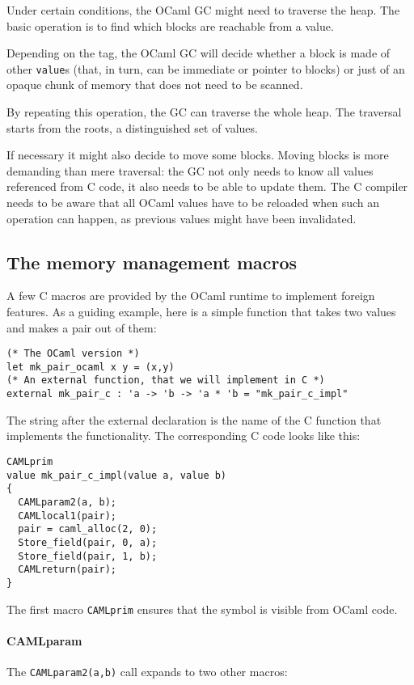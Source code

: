 \documentclass[a4paper]{easychair}
\newcommand{\cpp}[1]{\lstinline[style=C++]{#1}}
\begin{document}
Under certain conditions, the OCaml GC might need to traverse the heap.
The basic operation is to find which blocks are reachable from a value.

Depending on the tag, the OCaml GC will decide whether a block is made
of other \cpp{value}s (that, in turn, can be immediate or pointer to
blocks) or just of an opaque chunk of memory that does not need to be
scanned.

By repeating this operation, the GC can traverse the whole heap. The traversal
starts from the roots, a distinguished set of values.

If necessary it might also decide to move some blocks.  Moving blocks is more
demanding than mere traversal: the GC not only needs to know all values
referenced from C code, it also needs to be able to update them. The C compiler
needs to be aware that all OCaml values have to be reloaded when such an
operation can happen, as previous values might have been invalidated.

\subsection{The memory management macros}

A few C macros are provided by the OCaml runtime to implement foreign
features. As a guiding example, here is a simple function that takes two
values and makes a pair out of them:
%
\begin{lstlisting}[]
(* The OCaml version *)
let mk_pair_ocaml x y = (x,y)
(* An external function, that we will implement in C *)
external mk_pair_c : 'a -> 'b -> 'a * 'b = "mk_pair_c_impl"
\end{lstlisting}

The string after the external declaration is the name of the C function that
implements the functionality.  The corresponding C code looks like this:
%
\begin{lstlisting}[style=C++]
CAMLprim
value mk_pair_c_impl(value a, value b)
{
  CAMLparam2(a, b);
  CAMLlocal1(pair);
  pair = caml_alloc(2, 0);
  Store_field(pair, 0, a);
  Store_field(pair, 1, b);
  CAMLreturn(pair);
}
\end{lstlisting}

The first macro \cpp{CAMLprim} ensures that the symbol is visible from OCaml
code.

\paragraph{CAMLparam}
The \cpp{CAMLparam2(a,b)} call expands to two other macros:
\end{document}
